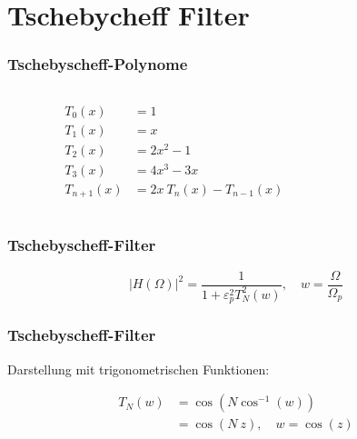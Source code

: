 \documentclass[ngerman, aspectratio=169, xcolor={rgb}]{beamer}
\begin{document}
	\section{Tschebycheff Filter}

	\begin{frame}
		\frametitle{Tschebyscheff-Polynome}


		\begin{columns}
			\begin{column}[T]{0.35\textwidth}

				\begin{align*}
					T_{0}(x)&=1\\
					T_{1}(x)&=x\\
					T_{2}(x)&=2x^{2}-1\\
					T_{3}(x)&=4x^{3}-3x\\
					T_{n+1}(x)&=2x~T_{n}(x)-T_{n-1}(x)
				\end{align*}

			\end{column}
			\begin{column}[T]{0.65\textwidth}

				\begin{center}
					\resizebox{\textwidth}{!}{
					
					}
				\end{center}

			\end{column}
		\end{columns}



	\end{frame}

	\begin{frame}
		\frametitle{Tschebyscheff-Filter}

		\begin{equation*}
			| H(\Omega)|^2 = \frac{1}{1 + \varepsilon_p^2 T_N^2(w)}, \quad w=\frac{\Omega}{\Omega_p}
		\end{equation*}

		\begin{center}
			\scalebox{0.9}{
				
			}
		\end{center}

	\end{frame}


	\begin{frame}
		\frametitle{Tschebyscheff-Filter}

		Darstellung mit trigonometrischen Funktionen:

		\begin{align} \label{ellfilter:eq:chebychef_polynomials}
			T_N(w) &= \cos \left( N \cos^{-1}(w) \right) \\
				&= \cos \left(N~z \right), \quad w= \cos(z)
		\end{align}


	\end{frame}
\end{document}
